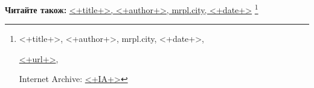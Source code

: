  
 
 
 
 

\def\pubIA{<+IA+>}
\def\pubTitle{<+title+>}
\def\pubDate{<+date+>}
\def\pubOrigin{<+url+>}
\def\pubAuthor{<+author+>}

\textbf{Читайте також:} \href{\pubIA}{%
\pubTitle, \pubAuthor, mrpl.city, \pubDate}%
\footnote{\pubTitle, \pubAuthor, mrpl.city, \pubDate, \par\url{\pubOrigin}, \par Internet Archive: \url{\pubIA}}
